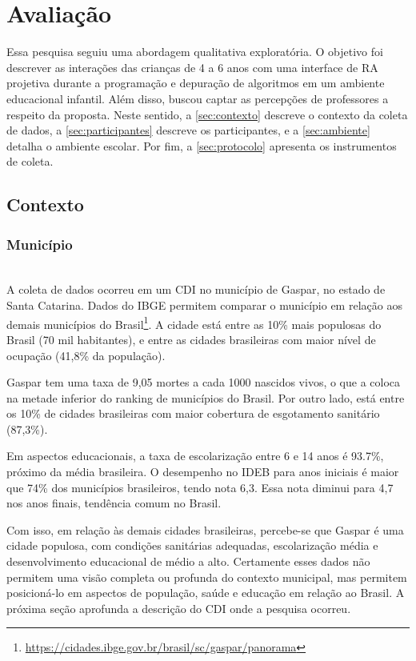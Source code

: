 \chapter{Avaliação}
\label{c_avaliacao}
Essa pesquisa seguiu uma abordagem qualitativa exploratória. O objetivo foi descrever as interações das crianças de 4 a 6 anos com uma interface de RA projetiva durante a programação e depuração de algoritmos em um ambiente educacional infantil. Além disso, buscou captar as percepções de professores a respeito da proposta. Neste sentido, a \autoref{sec:contexto} descreve o contexto da coleta de dados, a \autoref{sec:participantes} descreve os participantes, e a \autoref{sec:ambiente} detalha o ambiente escolar. Por fim, a \autoref{sec:protocolo} apresenta os instrumentos de coleta.
 
\section{Contexto}
\label{sec:contexto}
\subsection{Município}\\
A coleta de dados ocorreu em um \ac{CDI} no município de Gaspar, no estado de Santa Catarina. Dados do \ac{IBGE} permitem comparar o município em relação aos demais municípios do Brasil\footnote{\url{https://cidades.ibge.gov.br/brasil/sc/gaspar/panorama}}. A cidade está entre as 10\% mais populosas do Brasil (70 mil habitantes), e entre as cidades brasileiras com maior nível de ocupação (41,8\% da população).
 
Gaspar tem uma taxa de 9,05 mortes a cada 1000 nascidos vivos, o que a coloca na metade inferior do ranking de municípios do Brasil. Por outro lado, está entre os 10\% de cidades brasileiras com maior cobertura de esgotamento sanitário (87,3\%).
 
Em aspectos educacionais, a taxa de escolarização entre 6 e 14 anos é 93.7\%, próximo da média brasileira. O desempenho no \ac{IDEB} para anos iniciais é maior que 74\% dos municípios brasileiros, tendo nota 6,3. Essa nota diminui para 4,7 nos anos finais, tendência comum no Brasil.
 
Com isso, em relação às demais cidades brasileiras, percebe-se que Gaspar é uma cidade populosa, com condições sanitárias adequadas, escolarização média e desenvolvimento educacional de médio a alto. Certamente esses dados não permitem uma visão completa ou profunda do contexto municipal, mas permitem posicioná-lo em aspectos de população, saúde e educação em relação ao Brasil. A próxima seção aprofunda a descrição do CDI onde a pesquisa ocorreu.
 
